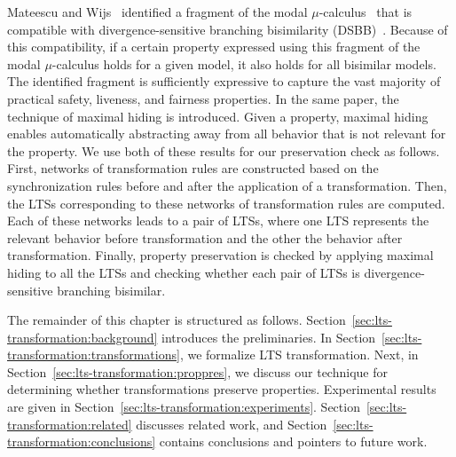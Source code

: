 Mateescu and Wijs~\cite{mateescu.wijs.propred} identified a fragment of the modal $\mu$-calculus~\cite{Kozen-83} that is compatible with divergence-sensitive branching bisimilarity (DSBB)~\cite{GlaLutTrc09}.
Because of this compatibility, if a certain property expressed using this fragment of the modal $\mu$-calculus holds for a given model, it also holds for all bisimilar models.
The identified fragment is sufficiently expressive to capture the vast majority of practical safety, liveness, and fairness properties.
In the same paper, the technique of maximal hiding is introduced.
Given a property, maximal hiding enables automatically abstracting away from all behavior that is not relevant for the property.
We use both of these results for our preservation check as follows.
First, networks of transformation rules are constructed based on the synchronization rules before and after the application of a transformation.
Then, the LTSs corresponding to these networks of transformation rules are computed.
Each of these networks leads to a pair of LTSs, where one LTS represents the relevant behavior before transformation and the other the behavior after transformation.
Finally, property preservation is checked by applying maximal hiding to all the LTSs and checking whether each pair of LTSs is divergence-sensitive branching bisimilar.

The remainder of this chapter is structured as follows.
Section~\ref{sec:lts-transformation:background} introduces the preliminaries.
In Section~\ref{sec:lts-transformation:transformations}, we formalize LTS transformation.
Next, in Section~\ref{sec:lts-transformation:proppres}, we discuss our technique for determining whether transformations preserve properties.
Experimental results are given in Section~\ref{sec:lts-transformation:experiments}.
Section~\ref{sec:lts-transformation:related} discusses related work, and Section~\ref{sec:lts-transformation:conclusions} contains conclusions and pointers to future work. 